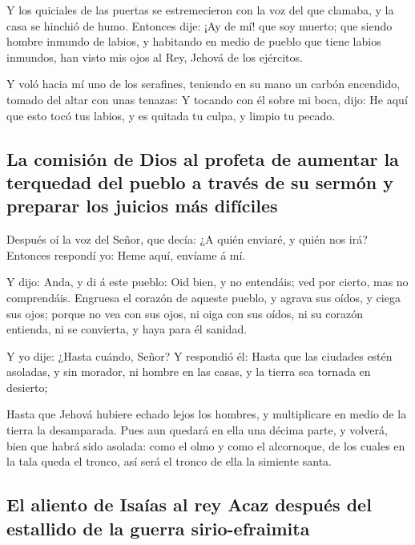  Y los quiciales de las puertas se estremecieron con la
voz del que clamaba, y la casa se hinchió de humo. 
Entonces dije: ¡Ay de mí! que soy muerto; que siendo hombre inmundo de
labios, y habitando en medio de pueblo que tiene labios inmundos, han
visto mis ojos al Rey, Jehová de los ejércitos.

 Y voló hacia mí uno de los serafines, teniendo en su mano
un carbón encendido, tomado del altar con unas tenazas:  Y
tocando con él sobre mi boca, dijo: He aquí que esto tocó tus labios, y
es quitada tu culpa, y limpio tu pecado.

\hypertarget{la-comisiuxf3n-de-dios-al-profeta-de-aumentar-la-terquedad-del-pueblo-a-travuxe9s-de-su-sermuxf3n-y-preparar-los-juicios-muxe1s-difuxedciles}{%
\subsection{La comisión de Dios al profeta de aumentar la terquedad del
pueblo a través de su sermón y preparar los juicios más
difíciles}\label{la-comisiuxf3n-de-dios-al-profeta-de-aumentar-la-terquedad-del-pueblo-a-travuxe9s-de-su-sermuxf3n-y-preparar-los-juicios-muxe1s-difuxedciles}}

 Después oí la voz del Señor, que decía: ¿A quién enviaré,
y quién nos irá? Entonces respondí yo: Heme aquí, envíame á mí.

 Y dijo: Anda, y di á este pueblo: Oid bien, y no
entendáis; ved por cierto, mas no comprendáis.  Engruesa
el corazón de aqueste pueblo, y agrava sus oídos, y ciega sus ojos;
porque no vea con sus ojos, ni oiga con sus oídos, ni su corazón
entienda, ni se convierta, y haya para él sanidad.

 Y yo dije: ¿Hasta cuándo, Señor? Y respondió él: Hasta
que las ciudades estén asoladas, y sin morador, ni hombre en las casas,
y la tierra sea tornada en desierto;

 Hasta que Jehová hubiere echado lejos los hombres, y
multiplicare en medio de la tierra la desamparada.  Pues
aun quedará en ella una décima parte, y volverá, bien que habrá sido
asolada: como el olmo y como el alcornoque, de los cuales en la tala
queda el tronco, así será el tronco de ella la simiente santa.

\hypertarget{el-aliento-de-isauxedas-al-rey-acaz-despuuxe9s-del-estallido-de-la-guerra-sirio-efraimita}{%
\subsection{El aliento de Isaías al rey Acaz después del estallido de la
guerra
sirio-efraimita}\label{el-aliento-de-isauxedas-al-rey-acaz-despuuxe9s-del-estallido-de-la-guerra-sirio-efraimita}}


